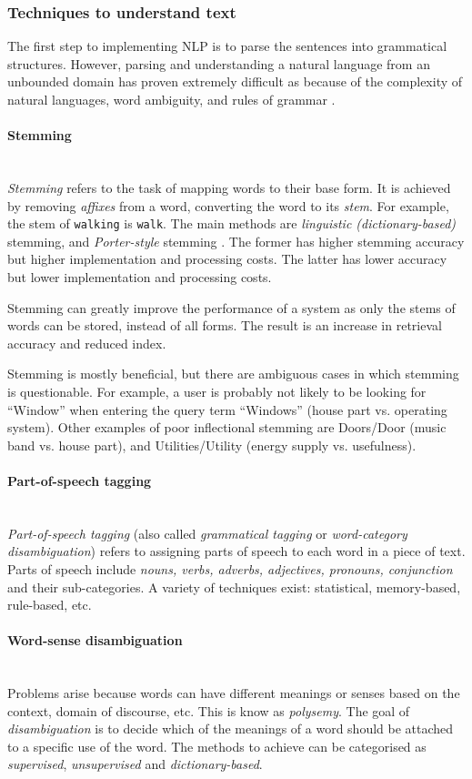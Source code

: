 \documentclass[12pt,a4paper]{article}
\newcommand{\myparagraph}[1]{\paragraph{#1}\mbox{}\\}
\begin{document}
\subsubsection{Techniques to understand text}
The first step to implementing NLP is to parse the sentences into grammatical structures. However, parsing and understanding a natural language from an unbounded domain has proven extremely difficult as because of the complexity of natural languages, word ambiguity, and rules of grammar \cite{Martinez2010}.

\myparagraph{Stemming}
\textit{Stemming} refers to the task of mapping words to their base form. It is achieved by removing \textit{affixes} from a word, converting the word to its \textit{stem}. For example, the stem of \texttt{walking} is \texttt{walk}. The main methods are \textit{linguistic (dictionary-based)} stemming, and \textit{Porter-style} stemming \cite{Porter1980}. The former has higher stemming accuracy but higher implementation and processing costs. The latter has lower accuracy but lower implementation and processing costs.

Stemming can greatly improve the performance of a system as only the stems of words can be stored, instead of all forms. The result is an increase in retrieval accuracy and reduced index.

Stemming is mostly beneficial, but there are ambiguous cases in which stemming is questionable. For example, a user is probably not likely to be looking for “Window” when entering the query term “Windows” (house part vs. operating system). Other examples
of poor inflectional stemming are Doors/Door (music band vs. house part), and Utilities/Utility (energy supply vs. usefulness).

\myparagraph{Part-of-speech tagging}
\textit{Part-of-speech tagging} (also called \textit{grammatical tagging} or \textit{word-category disambiguation}) refers to assigning parts of speech to each word in a piece of text. Parts of speech include \textit{nouns, verbs, adverbs, adjectives, pronouns, conjunction} and their sub-categories. A variety of techniques exist: statistical, memory-based, rule-based, etc.

\myparagraph{Word-sense disambiguation}
Problems arise because words can have different meanings or senses based on the context, domain of discourse, etc. This is know as \textit{polysemy}. The goal of \textit{disambiguation} is to decide which of the meanings of a word should be attached to a specific use of the word. The methods to achieve can be categorised as \textit{supervised}, \textit{unsupervised} and \textit{dictionary-based}.
\end{document}
